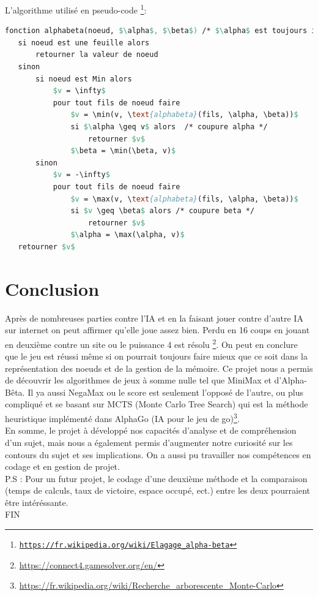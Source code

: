 \documentclass[a4paper,fleqn]{article}
\begin{document}
L'algorithme utilisé en pseudo-code \footnote{\href{https://fr.wikipedia.org/wiki/\%C3\%89lagage_alpha-b\%C3\%AAta}{\nolinkurl{https://fr.wikipedia.org/wiki/Elagage_alpha-beta}}}:

\begin{lstlisting}[language=Pascal, mathescape=true, caption=Algorithme Alpha-Bêta en pseudo-code]
fonction alphabeta(noeud, $\alpha$, $\beta$) /* $\alpha$ est toujours inferieur a $\beta$ */
   si noeud est une feuille alors
       retourner la valeur de noeud
   sinon 
       si noeud est Min alors
           $v = \infty$
           pour tout fils de noeud faire
               $v = \min(v, \text{alphabeta}(fils, \alpha, \beta))$                
               si $\alpha \geq v$ alors  /* coupure alpha */
                   retourner $v$
               $\beta = \min(\beta, v)$           
       sinon
           $v = -\infty$
           pour tout fils de noeud faire
               $v = \max(v, \text{alphabeta}(fils, \alpha, \beta))$                
               si $v \geq \beta$ alors /* coupure beta */
                   retourner $v$
               $\alpha = \max(\alpha, v)$
   retourner $v$
\end{lstlisting}

\pagebreak

\section{Conclusion}

Après de nombreuses parties contre l'IA et en la faisant jouer contre d'autre IA sur internet on peut affirmer qu'elle joue assez bien. Perdu en 16 coups en jouant en deuxième contre un site ou le puissance 4 est résolu \footnote{\url{https://connect4.gamesolver.org/en/}}. On peut en conclure que le jeu est réussi même si on pourrait toujours faire mieux que ce soit dans la représentation des noeuds et de la gestion de la mémoire. Ce projet nous a permis de découvrir les algorithmes de jeux à somme nulle tel que MiniMax et d'Alpha-Bêta. Il ya aussi NegaMax ou le score est seulement l'opposé de l'autre, ou plus compliqué et se basant sur MCTS (Monte Carlo Tree Search) qui est la méthode heuristique implémenté dans AlphaGo (IA pour le jeu de go)\footnote{\url{https://fr.wikipedia.org/wiki/Recherche_arborescente_Monte-Carlo}}.\\

En somme, le projet à développé nos capacités d'analyse et de compréhension d'un sujet, mais nous a également permis d'augmenter notre curiosité sur les contours du sujet et ses implications. On a aussi pu travailler nos compétences en codage et en gestion de projet.\\

P.S : Pour un futur projet, le codage d'une deuxième méthode et la comparaison (temps de calculs, taux de victoire, espace occupé, ect.) entre les deux pourraient être intéréssante.\\

\hspace{6.5cm} FIN \newline

\pagebreak
\end{document}
